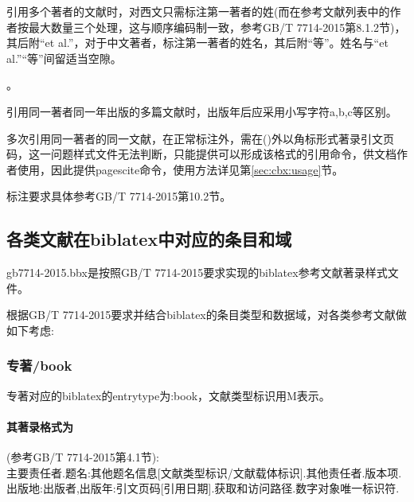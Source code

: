引用多个著者的文献时，对西文只需标注第一著者的姓(而在参考文献列表中的作者按最大数量三个处理，这与顺序编码制一致，参考GB/T 7714-2015第8.1.2节)，其后附“et al.”，对于中文著者，标注第一著者的姓名，其后附“等”。姓名与“et al.”“等”间留适当空隙。

。

引用同一著者同一年出版的多篇文献时，出版年后应采用小写字符a,b,c等区别。

多次引用同一著者的同一文献，在正常标注外，需在()外以角标形式著录引文页码，这一问题样式文件无法判断，只能提供可以形成该格式的引用命令，供文档作者使用，因此提供pagescite命令，使用方法详见第\ref{sec:cbx:usage}节。

标注要求具体参考GB/T 7714-2015第10.2节。



\subsection{各类文献在biblatex中对应的条目和域}\label{sec:numeric:data}
gb7714-2015.bbx是按照GB/T 7714-2015要求实现的biblatex参考文献著录样式文件。

根据GB/T 7714-2015要求并结合biblatex的条目类型和数据域，对各类参考文献做如下考虑:
\subsubsection{专著/book}
\begin{refentry}{}{}
专著对应的biblatex的entrytype为:book，文献类型标识用M表示。

\paragraph{其著录格式为}(参考GB/T 7714-2015第4.1节):\\
主要责任者.题名:其他题名信息[文献类型标识/文献载体标识].其他责任者.版本项.出版地:出版者,出版年:引文页码[引用日期].获取和访问路径.数字对象唯一标识符.
\end{refentry}

